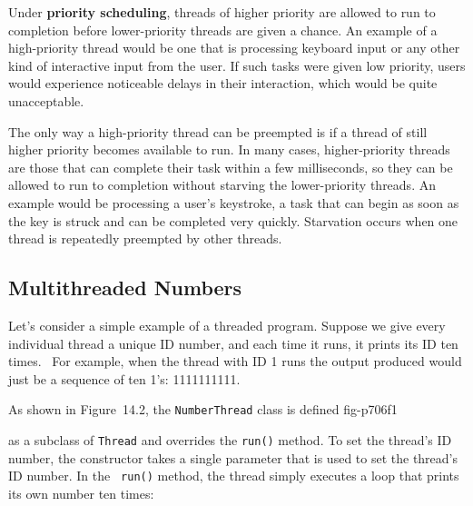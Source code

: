 Under {\bf priority scheduling}, threads of higher priority are
allowed to run to completion before lower-priority threads are given a
chance.  An example of a high-priority thread would be one that
is processing keyboard input or any other kind of interactive input
from the user.  If such tasks were given low priority, users would
experience noticeable delays in their interaction, which would be
quite unacceptable.

The only way a high-priority thread can be preempted is if a thread of
still higher priority becomes available to run.  In many cases,
higher-priority threads are those that can complete their task within
a few milliseconds, so they can be allowed to run to completion
without starving the lower-priority threads. An example would be
processing a user's keystroke, a task that can begin as soon as the
key is struck and can be completed very quickly. Starvation occurs
when one thread is repeatedly preempted by other threads.


\subsection{Multithreaded Numbers}
\noindent Let's consider a simple example of a threaded program.  Suppose we give
every individual thread a unique ID number, and each time it runs, it
prints its ID ten times. ~For example, when the thread with ID 1
runs the output produced would just be a sequence of ten 1's: 1111111111.



As shown in Figure~14.2, the {\tt NumberThread} class is defined
{fig-p706f1}

as a subclass of {\tt Thread} and overrides the {\tt run()} method.
To set the thread's ID number, the constructor takes a single
parameter that is used to set the thread's ID number.  In the {\tt
run()} method, the thread simply executes a loop that prints its own
number ten times:

